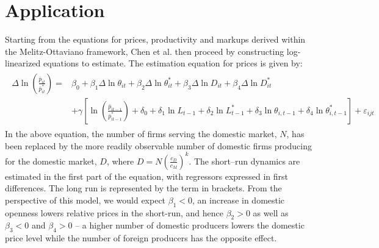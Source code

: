 \documentclass[a4paper,12pt]{article}
\begin{document}
\section{Application}\label{sec:app}
Starting from the equations for prices, productivity and markups derived within the Melitz-Ottaviano framework, Chen et al. then proceed by constructing log-linearized equations to estimate. The estimation equation for prices is given by:
\begin{align}
\begin{split}\label{eq:chen-estimation-prices}
\Delta \ln \left( \frac{\bar{p}_{it}}{\bar{p}_{it}^*} \right) = &\beta_0 + \beta_1 \Delta \ln \theta_{it} + \beta_2 \Delta \ln \theta_{it}^* + \beta_3 \Delta \ln D_{it} + \beta_4 \Delta \ln D_{it}^* \\ &+ \gamma \left[ \ln \left( \frac{\bar{p}_{it-1}}{\bar{p}_{it-1}^*} \right) + \delta_0 + \delta_1 \ln L_{t-1} + \delta_2\ln L_{t-1}^* + \delta_3 \ln  \theta_{i,t-1} + \delta_4 \ln  \theta_{i,t-1}^* \right] + \varepsilon_{ijt} 
\end{split}\end{align}
In the above equation, the number of firms serving the domestic market, $N$, has been replaced by the more readily observable number of domestic firms producing for the domestic market, $D$, where $D=N \left( \frac{c_D}{c_M} \right)^k$. The short--run dynamics are estimated in the first part of the equation, with regressors expressed in first differences. The long run is represented by the term in brackets. From the perspective of this model, we would expect $\beta_1<0$, an increase in domestic openness lowers relative prices in the short-run, and hence $\beta_2>0$ as well as $\beta_3<0$ and $\beta_4>0$ -- a higher number of domestic producers lowers the domestic price level while the number of foreign producers has the opposite effect.
\end{document}

